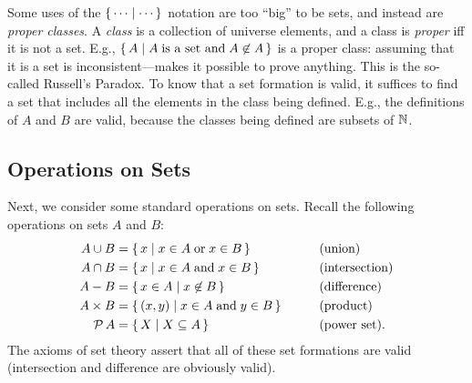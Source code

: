 Some uses of the $\{ \, \cdots \mid \cdots \, \}$ notation are too ``big'' to
be sets, and instead are \emph{proper classes}. A \emph{class} is a
collection of universe elements, and a class is \emph{proper} iff it
is not a set.  E.g., $\{ \, A \mid A\;\allowbreak\mbox{is a set and}\allowbreak\; A\not\in A \, \}$ is
a proper class: assuming that it is a set is inconsistent---makes it
possible to prove anything. This is the so-called Russell's Paradox.
%
To know that a set formation is valid, it suffices to find a set that
includes all the elements in the class being defined.  E.g., the
definitions of $A$ and $B$ are valid, because the classes being
defined are subsets of $\mathbb{N}$.
%
%

\subsection{Operations on Sets}

Next, we consider some standard operations
on sets.  Recall the following operations on sets $A$ and $B$:
\begin{alignat*}{2}
A\cup B&=\setof{x}{x\in A\eqtxt{or}x\in B}
&&\by{union}\\
\index{ union@$\cup$}%
\index{set! union@$\cup$}%
\index{union!set}%
\index{set!union|see{union, set}}%
A\cap B&=\setof{x}{x\in A\eqtxt{and}x\in B}
&&\by{intersection} \\
\index{ intersection@$\cap$}%
\index{set! intersection@$\cap$}%
\index{intersection!set}%
\index{set!intersection|see{intersection, set}}%
A-B&=\setof{x\in A}{x\not\in B}
&&\by{difference} \\
\index{ difference@$-$}%
\index{set! difference@$-$}%
\index{difference!set}%
\index{set!difference}%
A\times B&=\setof{(x,y)}{x\in A\eqtxt{and}y\in B}
&&\by{product} \\
\index{ product@$\times$}%
\index{set! product@$\times$}%
\index{product}%
\index{set!product}%
\powset\,A&=\setof{X}{X\sub A}
&&\by{power set}.
\index{powerset@$\powset$}%
\index{set!powerset@$\powset$}%
\index{powerset}%
\index{set!powerset}%
\end{alignat*}
The axioms of set theory assert that all of these set formations
are valid (intersection and difference are obviously
valid).

